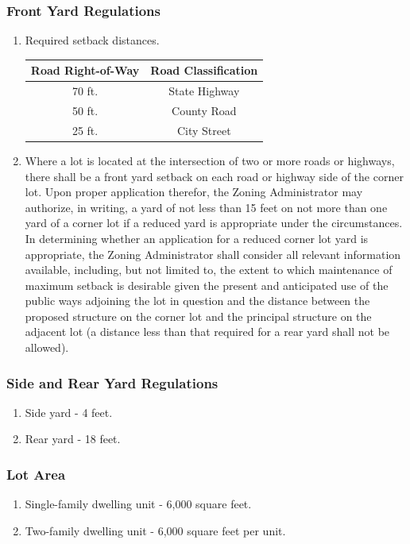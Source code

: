 \subsubsection{Front Yard Regulations}
\begin{enumerate}[{\indent}a)]
    \item Required setback distances.        
        \begin{center}
        \begin{tabular}{|c|c|}
            \hline
            \textbf{Road Right-of-Way} & \textbf{Road Classification}\\
            \hline
            70 ft. & State Highway\\
            \hline
            50 ft. & County Road\\
            \hline
            25 ft. & City Street\\
            \hline
        \end{tabular}
        \end{center}
    \item Where a lot is located at the intersection of two or more roads or highways, there shall be a front yard setback on each road or highway side of the corner lot. Upon proper application therefor, the Zoning Administrator may authorize, in writing, a yard of not less than 15 feet on not more than one yard of a corner lot if a reduced yard is appropriate under the circumstances. In determining whether an application for a reduced corner lot yard is appropriate, the Zoning Administrator shall consider all relevant information available, including, but not limited to, the extent to which maintenance of maximum setback is desirable given the present and anticipated use of the public ways adjoining the lot in question and the distance between the proposed structure on the corner lot and the principal structure on the adjacent lot (a distance less than that required for a rear yard shall not be allowed).
\end{enumerate}
\subsubsection{Side and Rear Yard Regulations}
\begin{enumerate}[{\indent}a)]
    \item Side yard - 4 feet.
    \item Rear yard - 18 feet.
\end{enumerate}
\subsubsection{Lot Area}
\begin{enumerate}[{\indent}a)]
    \item Single-family dwelling unit - 6,000 square feet.
    \item Two-family dwelling unit - 6,000 square feet per unit.
\end{enumerate}
